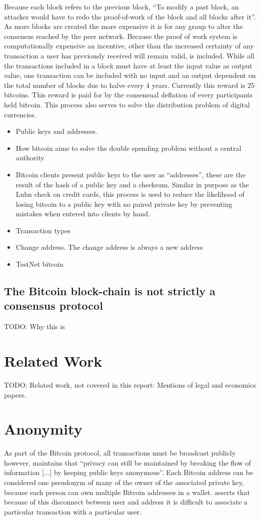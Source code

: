 Because each block refers to the previous block, ``To modify a past block, an
attacker would have to redo the proof-of-work of the block and all blocks after
it''.  As more blocks are created the more expensive it is for any group to
alter the consensus reached by the peer network.  Because the proof of work
system is computationally expensive an incentive, other than the increased
certainty of any transaction a user has previously received will remain valid,
is included.  While all the transactions included in a block must have at least
the input value as output value, one transaction can be included with no input
and an output dependent on the total number of blocks due to halve every 4
years. Currently this reward is 25 bitcoins. This reward is paid for by the
consensual deflation of every participants held bitcoin. This process also
serves to solve the distribution problem of digital currencies.

\begin{itemize} \item Public keys and addresses.  \item How bitcoin aims to
        solve the double spending problem without a central authority \item
            Bitcoin clients present public keys to the user as ``addresses'',
            these are the result of the hash of a public key and a checksum.
            Similar in purpose as the Luhn check on credit cards, this process
        is used to reduce the likelihood of losing bitcoin to a public key with
    no paired private key by preventing mistakes when entered into clients by
hand.  \item Transaction types \item Change address.  The change address is
always a new address \item TestNet bitcoin \end{itemize}

\subsection{The Bitcoin block-chain is not strictly a consensus protocol}
TODO: Why this is

\section{Related Work}
TODO: Related work, not covered in this report: Mentions of legal and economics papers.

\section{Anonymity} As part of the Bitcoin protocol, all transactions must be
broadcast publicly however, \textcite{satoshi} maintains that ``privacy can still be
maintained by breaking the flow of information [...] by keeping public keys
anonymous''.  Each Bitcoin address can be considered one pseudonym of many of
the owner of the associated private key, because each person can own multiple
Bitcoin addresses in a wallet. \textcite{satoshi} asserts that because of this disconnect
between user and address it is difficult to associate a particular transaction
with a particular user.

